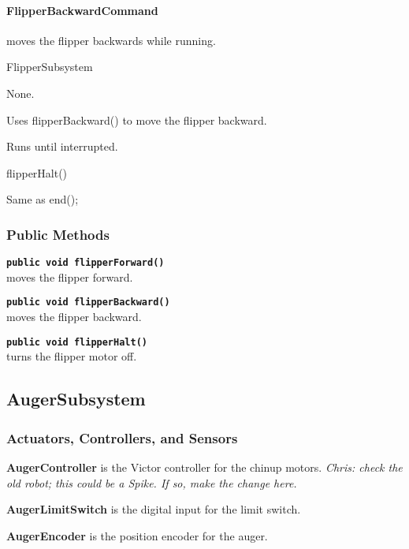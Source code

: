 \documentclass[]{article}
\begin{document}
\paragraph{FlipperBackwardCommand} moves the flipper backwards while running.
\begin{description}[topsep=0ex]
\item[requires] FlipperSubsystem
\item[initialization]  None.
\item[execute] Uses flipperBackward() to move the flipper backward.
\item[isDone] Runs until interrupted.
\item[end] flipperHalt()
\item[interrupted] Same as end();
\end{description}

\subsubsection{Public Methods}

\noindent \texttt{\textbf{public void flipperForward()}} \\
moves the flipper forward.

\noindent \texttt{\textbf{public void flipperBackward()}} \\
moves the flipper backward.

\noindent \texttt{\textbf{public void flipperHalt()}} \\
turns the flipper motor off.


\subsection{AugerSubsystem}

\subsubsection{Actuators, Controllers, and Sensors}

\textbf{AugerController} is the Victor controller for the chinup motors. \textit{Chris: check the old robot; this could be a Spike. If so, make the change here.}

\textbf{AugerLimitSwitch} is the digital input for the limit switch.

\textbf{AugerEncoder} is the position encoder for the auger.
\end{document}
